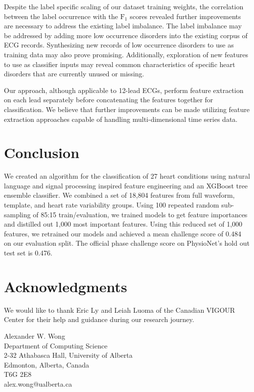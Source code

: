 \documentclass[twocolumn]{cinc}
\begin{document}
Despite the label specific scaling of our dataset training weights, the correlation between the label occurrence with the $\text{F}_1$ scores revealed further improvements are necessary to address the existing label imbalance.
The label imbalance may be addressed by adding more low occurrence disorders into the existing corpus of ECG records.
Synthesizing new records of low occurrence disorders to use as training data may also prove promising.
Additionally, exploration of new features to use as classifier inputs may reveal common characteristics of specific heart disorders that are currently unused or missing.

Our approach, although applicable to 12-lead ECGs, perform feature extraction on each lead separately before concatenating the features together for classification.
We believe that further improvements can be made utilizing feature extraction approaches capable of handling multi-dimensional time series data.

\section{Conclusion}

We created an algorithm for the classification of 27 heart conditions using natural language and signal processing inspired feature engineering and an XGBoost tree ensemble classifier.
We combined a set of 18,804 features from full waveform, template, and heart rate variability groups.
Using 100 repeated random sub-sampling of 85:15 train/evaluation, we trained models to get feature importances and distilled out 1,000 most important features.
Using this reduced set of 1,000 features, we retrained our models and achieved a mean challenge score of 0.484 on our evaluation split.
The official phase challenge score on PhysioNet's hold out test set is 0.476.


\section*{Acknowledgments}
We would like to thank Eric Ly and Leiah Luoma of the Canadian VIGOUR Center for their help and guidance during our research journey.



\begin{correspondence}
Alexander W. Wong\\
Department of Computing Science\\
2-32 Athabasca Hall, University of Alberta\\
Edmonton, Alberta, Canada\\
T6G 2E8\\
alex.wong@ualberta.ca
\end{correspondence}
\end{document}

